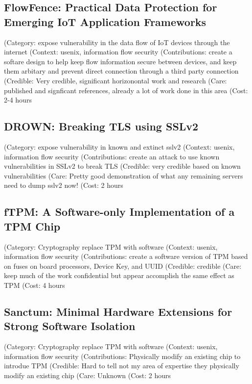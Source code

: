 \documentclass[conference]{journal}
\begin{document}
\subsection{FlowFence: Practical Data Protection for Emerging IoT Application Frameworks \cite{fernandes_flowfence:_2016}}
(Category:	expose vulnerability in the data flow of IoT devices through the internet
(Context:	usenix, information flow security
(Contributions:	create a softare design to help keep flow information secure between devices, and keep them arbitary and prevent direct connection through a third party connection
(Credible:	Very credible, significant horizonontal work and research
(Care:	published and signficant references, already a lot of work done in this area
(Cost:	2-4 hours

\subsection{DROWN: Breaking TLS using SSLv2 \cite{aviram_drown:_2016}}
(Category:	expose vulnerability in known and extinct sslv2
(Context:	usenix, information flow security
(Contributions:	create an attack to use known vulnerabilities in SSLv2 to break TLS
(Credible:	very credible based on known vulnerabilities
(Care:	Pretty good demonstration of what any remaining servers need to dump sslv2 now!
(Cost:	2 hours

\subsection{fTPM: A Software-only Implementation of a TPM Chip \cite{raj_ftpm:_2016}}
(Category:	Cryptography replace TPM with software	
(Context:	usenix, information flow security	
(Contributions:	create a software version of TPM based on fuses on board processors, Device Key, and UUID	
(Credible:	credible	
(Care:	keep much of the work confidential but appear accomplish the same effect as TPM	
(Cost:	4	hours

\subsection{Sanctum: Minimal Hardware Extensions for Strong Software Isolation \cite{costan_sanctum:_2016}}
(Category:	Cryptography replace TPM with software	
(Context:	usenix, information flow security	
(Contributions:	Physically modify an existing chip to introdue TPM	
(Credible:	Hard to tell not my area of expertise they physically modify an existing chip	
(Care:	Unknown	
(Cost:	2	hours
\end{document}
